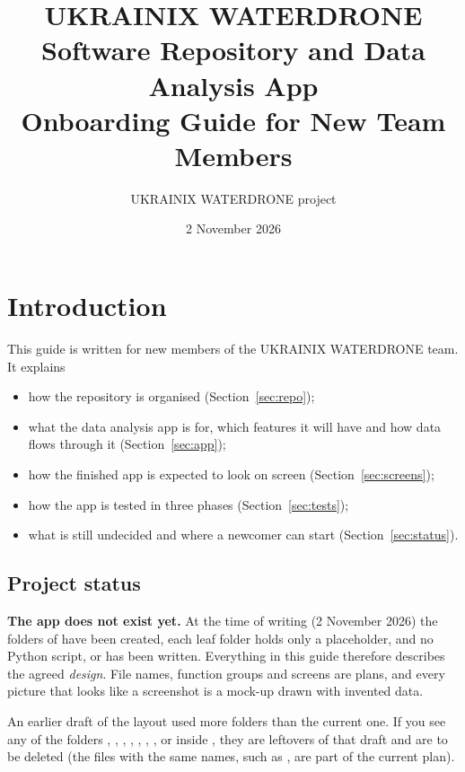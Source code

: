 \documentclass{article}
\title{UKRAINIX WATERDRONE\\[2mm]
       Software Repository and Data Analysis App\\[2mm]
       \large Onboarding Guide for New Team Members}
\author{UKRAINIX WATERDRONE project}
\date{2 November 2026}
\begin{document}
\maketitle
\tableofcontents

\section{Introduction}
\label{sec:intro}

This guide is written for new members of the UKRAINIX WATERDRONE team.
It explains

\begin{itemize}
\item how the  repository is organised
      (Section~\ref{sec:repo});
\item what the data analysis app is for, which features it will have and how
      data flows through it (Section~\ref{sec:app});
\item how the finished app is expected to look on screen
      (Section~\ref{sec:screens});
\item how the app is tested in three phases (Section~\ref{sec:tests});
\item what is still undecided and where a newcomer can start
      (Section~\ref{sec:status}).
\end{itemize}

\subsection{Project status}

\textbf{The app does not exist yet.} At the time of writing
(2 November 2026) the folders of  have been created, each
leaf folder holds only a  placeholder, and no Python script,
 or  has been written. Everything in
this guide therefore describes the agreed \emph{design}. File names, function
groups and screens are plans, and every picture that looks like a screenshot
is a mock-up drawn with invented data.

An earlier draft of the layout used more folders than the current one. If you
see any of the folders , ,
, , , ,
,  or  inside
, they are leftovers of that draft and are to be deleted
(the files with the same names, such as , are part of
the current plan).
\end{document}
